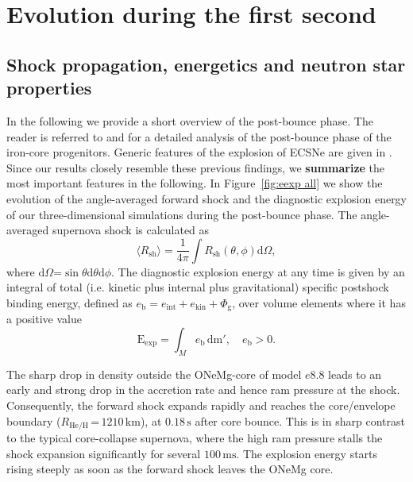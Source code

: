 \documentclass[fleqn,usenatbib]{mnras}
\newcommand{\ud}{\ensuremath{\mathrm{d}}\xspace}
\newcommand{\s}{\ensuremath{\text{s}}}
\begin{document}
\section{Evolution during the first second}
\label{sec:Evolution during the first second}
\subsection{Shock propagation, energetics and neutron star properties}
In the following we provide a short overview of the post-bounce phase. The reader is referred to \cite{Melson2015a} and \cite{Melson2019} for a detailed analysis of the post-bounce phase of the iron-core progenitors. Generic features of the explosion of ECSNe are given in \cite{Kitaura2006,Janka2008,Gessner2018}. Since our results closely resemble these previous findings, we \textbf{summarize} the most important features in the following.
In Figure~\ref{fig:eexp all} we show the evolution of the angle-averaged forward shock and the diagnostic explosion energy of our three-dimensional simulations during the post-bounce phase. 
The angle-averaged supernova shock is calculated as
\begin{equation}
    \langle R_{\mathrm{sh}} \rangle =  \frac{1}{4\pi}\int R_{\mathrm{sh}}(\theta,\phi)\ud \Omega,
    \label{equ:avg rsh}
\end{equation}
where $\ud \Omega\mathord{=}\sin{\theta}\ud\theta\ud\phi$.
The diagnostic explosion energy at any time is given by an integral of total (i.e. kinetic plus internal plus gravitational) specific postshock binding energy, defined as $e_{\text{b}} = e_{\mathrm{int}} + e_{\mathrm{kin}} + \Phi_{\text{g}}$, over volume elements where it has a positive value 
\begin{equation}
    \mathrm{E}_{\mathrm{exp}} = \int_{M} e_{\mathrm{b}} \, \mathrm{dm'},\quad e_{\mathrm{b}} > 0.
    \label{equ:ene exp}
\end{equation}

The sharp drop in density outside the ONeMg-core of model $e8.8$ leads to an early and strong drop in the accretion rate and hence ram pressure at the shock.
Consequently, the forward shock expands rapidly and reaches the core/envelope boundary ($R_{\mathrm{He/H}}\,\mathord{=}\,1210\,\text{km}$), at $0.18\,\s$ after core bounce.
This is in sharp contrast to the typical core-collapse supernova, where the high ram pressure stalls the shock expansion significantly for several $100\,\text{ms}$. The explosion energy starts rising steeply as soon as the forward shock leaves the ONeMg core.
\end{document}
